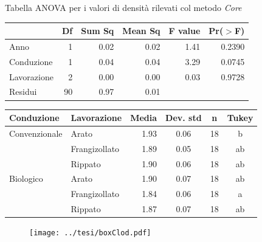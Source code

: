 \documentclass[10pt]{beamer}
\begin{document}
\begin{frame}{Tabella ANOVA per i valori di densità rilevati col metodo \emph{Core}} 
  \begin{table}[ht]
    \centering
    \label{tab:anova del modello}
    \begin{tabular}{lrrrrr}
      \hline
      & Df & Sum Sq & Mean Sq & F value & Pr($>$F) \\ 
      \hline
      Anno & 1 & 0.02 & 0.02 & 1.41 & 0.2390 \\ 
      Conduzione & 1 & 0.04 & 0.04 & 3.29 & 0.0745 \\ 
      Lavorazione & 2 & 0.00 & 0.00 & 0.03 & 0.9728 \\ 
      Residui & 90 & 0.97 & 0.01 &  &  \\ 
      \hline
    \end{tabular}
  \end{table}
\end{frame}

\begin{frame}[label=Clod]
  \hyperlink{finale}{}
  \footnotesize
  \begin{table}[ht]
    \centering
    \begin{tabular}{llrccc}
      \hline
      Conduzione & Lavorazione & Media & Dev. std & n & Tukey \\ 
      \hline
      Convenzionale & Arato & 1.93 & 0.06 &  18 & b \\ 
                 & Frangizollato & 1.89 & 0.05 &  18 & ab \\ 
                 & Rippato & 1.90 & 0.06 &  18 & ab \\ 
      Biologico & Arato & 1.90 & 0.07 &  18 & ab \\ 
                 & Frangizollato & 1.84 & 0.06 &  18 & a \\ 
                 & Rippato & 1.87 & 0.07 &  18 & ab \\ 
      \hline
    \end{tabular}
    \label{tab:RiassuntoDensitaSpinta}
  \end{table}
\end{frame}

\begin{frame}
  \vspace{1.5cm}
  \begin{figure}
    \texttt{[image: ../tesi/boxClod.pdf]}
  \end{figure}
\end{frame}
\end{document}
